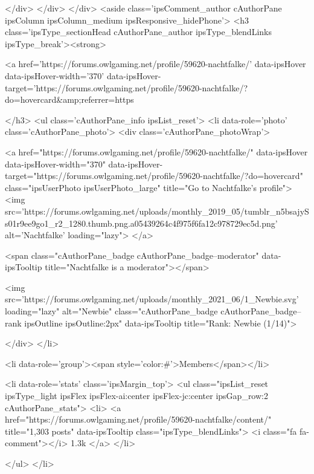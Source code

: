 			</div>
		</div>
	</div>
	<aside class='ipsComment_author cAuthorPane ipsColumn ipsColumn_medium ipsResponsive_hidePhone'>
		<h3 class='ipsType_sectionHead cAuthorPane_author ipsType_blendLinks ipsType_break'><strong>


<a href='https://forums.owlgaming.net/profile/59620-nachtfalke/' data-ipsHover data-ipsHover-width='370' data-ipsHover-target='https://forums.owlgaming.net/profile/59620-nachtfalke/?do=hovercard&amp;referrer=https%
			
		</h3>
		<ul class='cAuthorPane_info ipsList_reset'>
			<li data-role='photo' class='cAuthorPane_photo'>
				<div class='cAuthorPane_photoWrap'>
					


	<a href="https://forums.owlgaming.net/profile/59620-nachtfalke/" data-ipsHover data-ipsHover-width="370" data-ipsHover-target="https://forums.owlgaming.net/profile/59620-nachtfalke/?do=hovercard" class="ipsUserPhoto ipsUserPhoto_large" title="Go to Nachtfalke's profile">
		<img src='https://forums.owlgaming.net/uploads/monthly_2019_05/tumblr_n5bsajySs01r9ee9go1_r2_1280.thumb.png.a05439264c4f975f6fa12c978729ec5d.png' alt='Nachtfalke' loading="lazy">
	</a>

					
						<span class="cAuthorPane_badge cAuthorPane_badge--moderator" data-ipsTooltip title="Nachtfalke is a moderator"></span>
					
					
						
<img src='https://forums.owlgaming.net/uploads/monthly_2021_06/1_Newbie.svg' loading="lazy" alt="Newbie" class="cAuthorPane_badge cAuthorPane_badge--rank ipsOutline ipsOutline:2px" data-ipsTooltip title="Rank: Newbie (1/14)">
					
				</div>
			</li>
			
				<li data-role='group'><span style='color:#'>Members</span></li>
				
			
			
				<li data-role='stats' class='ipsMargin_top'>
					<ul class="ipsList_reset ipsType_light ipsFlex ipsFlex-ai:center ipsFlex-jc:center ipsGap_row:2 cAuthorPane_stats">
						<li>
							<a href="https://forums.owlgaming.net/profile/59620-nachtfalke/content/" title="1,303 posts" data-ipsTooltip class="ipsType_blendLinks">
								<i class="fa fa-comment"></i> 1.3k
							</a>
						</li>
						
					</ul>
				</li>
			
